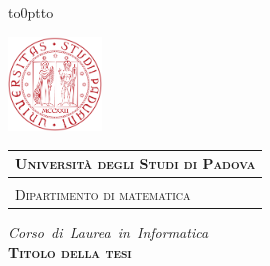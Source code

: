 \begin{titlepage} %
\begin{center}
\vbox to0pt{\vbox to\vss}

\hspace{0.5cm}
\begin{minipage}{.20\textwidth}
  \includegraphics[height=2.5cm]{images/unipd-red}
\end{minipage}\begin{minipage}{.90\textwidth}
  \begin{table}[H]
  \begin{tabular}{l}
  \scshape{\Large{\bfseries{Università degli Studi di Padova}}} \\
  \hline \\
  \scshape{\Large{Dipartimento di matematica}} \\
  \end{tabular}
  \end{table}
\end{minipage}

\vspace{1cm}
\emph{\Large{Corso~di~Laurea~in~Informatica}} \\
\vspace{1.5cm}
\scshape{\Large{\bfseries{Titolo della tesi}}} \\
\end{center}


\end{titlepage}
